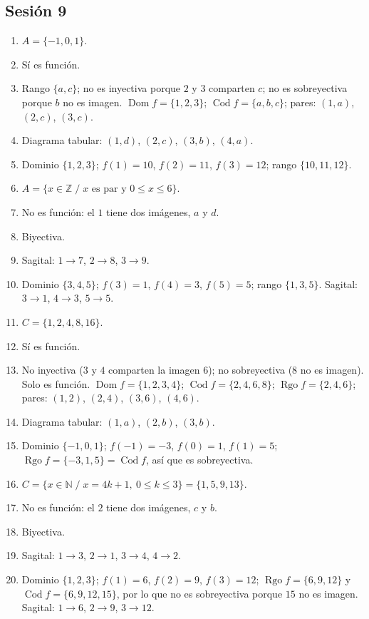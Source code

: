 \documentclass[12pt, letterpaper]{article}
\newcommand{\N}{\mathbb{N}}
\newcommand{\Z}{\mathbb{Z}}
\begin{document}
\subsection*{Sesión 9}
\begin{enumerate}[leftmargin=*, label=\textbf{\arabic*.}]
  \item $A=\{-1,0,1\}$.
  \item Sí es función.
  \item Rango $\{a,c\}$; no es inyectiva porque $2$ y $3$ comparten $c$; no es sobreyectiva porque $b$ no es imagen. $\operatorname{Dom} f=\{1,2,3\}$; $\operatorname{Cod} f=\{a,b,c\}$; pares: $(1,a)$, $(2,c)$, $(3,c)$.
  \item Diagrama tabular: $(1,d)$, $(2,c)$, $(3,b)$, $(4,a)$.
  \item Dominio $\{1,2,3\}$; $f(1)=10$, $f(2)=11$, $f(3)=12$; rango $\{10,11,12\}$.
  \item $A=\{x\in\Z \;/\; x \text{ es par y } 0\le x\le 6\}$.
  \item No es función: el $1$ tiene dos imágenes, $a$ y $d$.
  \item Biyectiva.
  \item Sagital: $1\to7$, $2\to8$, $3\to9$.
  \item Dominio $\{3,4,5\}$; $f(3)=1$, $f(4)=3$, $f(5)=5$; rango $\{1,3,5\}$. Sagital: $3\to1$, $4\to3$, $5\to5$.
  \item $C=\{1,2,4,8,16\}$.
  \item Sí es función.
  \item No inyectiva ($3$ y $4$ comparten la imagen $6$); no sobreyectiva ($8$ no es imagen). Solo es función. $\operatorname{Dom} f=\{1,2,3,4\}$; $\operatorname{Cod} f=\{2,4,6,8\}$; $\operatorname{Rgo} f=\{2,4,6\}$; pares: $(1,2)$, $(2,4)$, $(3,6)$, $(4,6)$.
  \item Diagrama tabular: $(1,a)$, $(2,b)$, $(3,b)$.
  \item Dominio $\{-1,0,1\}$; $f(-1)=-3$, $f(0)=1$, $f(1)=5$; $\operatorname{Rgo} f=\{-3,1,5\}=\operatorname{Cod} f$, así que es sobreyectiva.
  \item $C=\{x\in\N \;/\; x=4k+1,\ 0\le k\le 3\}=\{1,5,9,13\}$.
  \item No es función: el $2$ tiene dos imágenes, $c$ y $b$.
  \item Biyectiva.
  \item Sagital: $1\to3$, $2\to1$, $3\to4$, $4\to2$.
  \item Dominio $\{1,2,3\}$; $f(1)=6$, $f(2)=9$, $f(3)=12$; $\operatorname{Rgo} f=\{6,9,12\}$ y $\operatorname{Cod} f=\{6,9,12,15\}$, por lo que no es sobreyectiva porque $15$ no es imagen. Sagital: $1\to6$, $2\to9$, $3\to12$.
\end{enumerate}
\end{document}
